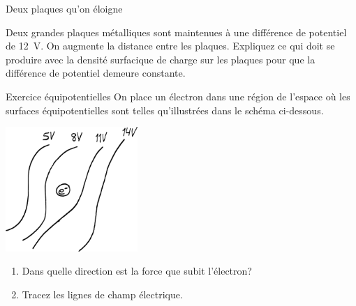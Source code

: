 \documentclass{beamer}
\begin{document}
\begin{frame}{Deux plaques qu'on éloigne}

Deux grandes plaques métalliques sont maintenues à une différence de potentiel
de \SI{12}{V}. On augmente la distance entre les plaques. Expliquez ce qui doit
se produire avec la densité surfacique de charge sur les plaques pour que la
différence de potentiel demeure constante.

\end{frame}



\begin{frame}{Exercice équipotentielles}
On place un électron dans une région de l'espace où les surfaces
équipotentielles sont telles qu'illustrées dans le schéma ci-dessous.

\begin{center}
  \includegraphics[width=5cm]{figures/exercice-equipotentielles.pdf}
\end{center}

\begin{enumerate}
  \item Dans quelle direction est la force que subit l'électron?
  \item Tracez les lignes de champ électrique.
\end{enumerate}
\end{frame}
\end{document}
